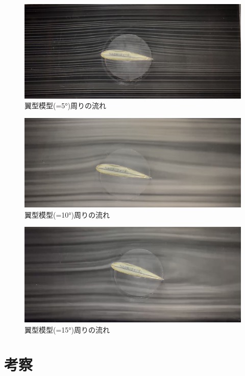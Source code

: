 \documentclass[a4paper,titlepage]{ltjsarticle}
\begin{document}
\begin{figure}[hbtp]
  \centering
  \includegraphics[width=12cm]{翼型模型5周りの流れ.jpg}
  \caption{翼型模型(\theta=\ang{5})周りの流れ}
  \label{翼型模型5}
\end{figure}


\begin{figure}[hbtp]
  \centering
  \includegraphics[width=12cm]{翼型模型10周りの流れ.jpg}
  \caption{翼型模型(\theta=\ang{10})周りの流れ}
  \label{翼型模型10}
\end{figure}

\clearpage

\begin{figure}[hbtp]
  \centering
  \includegraphics[width=12cm]{翼型模型15周りの流れ.jpg}
  \caption{翼型模型(\theta=\ang{15})周りの流れ}
  \label{翼型模型15}
\end{figure}


\section{考察}
\end{document}
